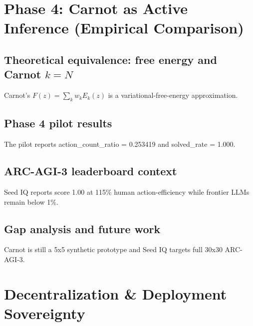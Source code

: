 
\section{Phase 4: Carnot as Active Inference (Empirical Comparison)}
\label{sec:phase4-active-inference}
\subsection{Theoretical equivalence: free energy and Carnot $k=N$}
Carnot's $F(z)=\sum_k w_k E_k(z)$ is a variational-free-energy approximation.
\subsection{Phase 4 pilot results}
The pilot reports action_count_ratio = 0.253419 and solved_rate = 1.000.
\subsection{ARC-AGI-3 leaderboard context}
Seed IQ reports score 1.00 at 115\% human action-efficiency while frontier LLMs remain below 1\%.
\subsection{Gap analysis and future work}
Carnot is still a 5x5 synthetic prototype and Seed IQ targets full 30x30 ARC-AGI-3.
\section{Decentralization \& Deployment Sovereignty}
